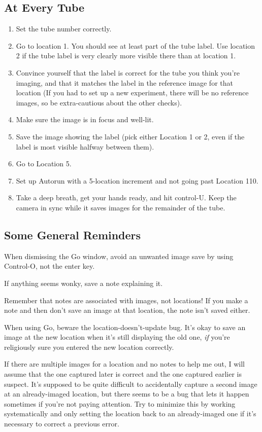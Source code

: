 \documentclass[11pt]{article}
\begin{document}
\subsection{At Every Tube}
	\begin{enumerate}
		\item{Set the tube number correctly.}
		\item{Go to location 1. You should see at least part of the tube label. Use location 2 if the tube label is very clearly more visible there than at location 1.}
		\item{Convince yourself that the label is correct for the tube you think you're imaging, and that it matches the label in the reference image for that location (If you had to set up a new experiment, there will be no reference images, so be extra-cautious about the other checks).}
		\item{Make sure the image is in focus and well-lit.}
		\item{Save the image showing the label (pick either Location 1 or 2, even if the label is most visible halfway between them).}
		\item{Go to Location 5.}
		\item{Set up Autorun with a 5-location increment and not going past Location 110.}
		\item{Take a deep breath, get your hands ready, and hit control-U. Keep the camera in sync while it saves images for the remainder of the tube.}
	\end{enumerate}	

\subsection{Some General Reminders}

	When dismissing the Go window, avoid an unwanted image save by using Control-O, not the enter key.
	
	If anything seems wonky, save a note explaining it.
	
	Remember that notes are associated with images, not locations! If you make a note and then don't save an image at that location, the note isn't saved either.
	
	When using Go, beware the location-doesn't-update bug. It's okay to save an image at the new location when it's still displaying the old one, \textit{if} you're religiously sure you entered the new location correctly.
	
	If there are multiple images for a location and no notes to help me out, I will assume that the one captured later is correct and the one captured earlier is suspect. It's supposed to be quite difficult to accidentally capture a second image at an already-imaged location, but there seems to be a bug that lets it happen sometimes if you're not paying attention. Try to minimize this by working systematically and only setting the location back to an already-imaged one if it's necessary to correct a previous error.
\end{document}
